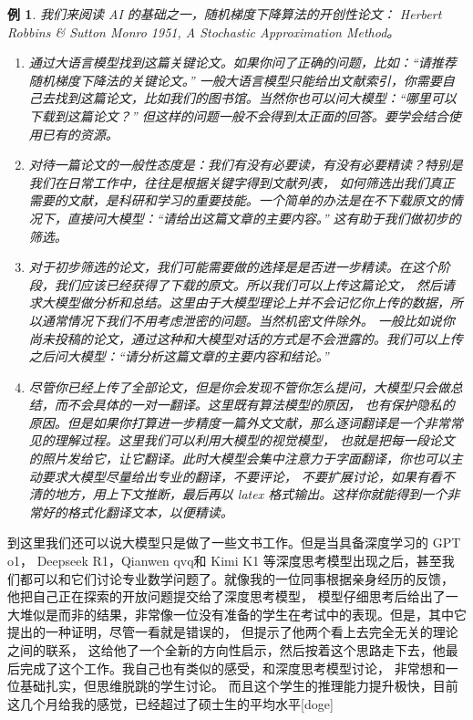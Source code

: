\documentclass{ctexbook}
\newtheorem{example}[theorem]{例}
\numberwithin{theorem}{chapter}
\begin{document}
\begin{example}
  我们来阅读 AI 的基础之一，随机梯度下降算法的开创性论文：
  Herbert Robbins \textup{\&} Sutton Monro 1951, A Stochastic Approximation Method\cite{robbins1951stochastic}。 

  \begin{enumerate}
    \item 通过大语言模型找到这篇关键论文。如果你问了正确的问题，比如：“请推荐随机梯度下降法的关键论文。” 
    一般大语言模型只能给出文献索引，你需要自己去找到这篇论文，比如我们的图书馆。当然你也可以问大模型：“哪里可以下载到这篇论文？” 
    但这样的问题一般不会得到太正面的回答。要学会结合使用已有的资源。
    \item 对待一篇论文的一般性态度是：我们有没有必要读，有没有必要精读？特别是我们在日常工作中，往往是根据关键字得到文献列表，
    如何筛选出我们真正需要的文献，是科研和学习的重要技能。一个简单的办法是在不下载原文的情况下，直接问大模型：“请给出这篇文章的主要内容。”
    这有助于我们做初步的筛选。
    \item 对于初步筛选的论文，我们可能需要做的选择是是否进一步精读。在这个阶段，我们应该已经获得了下载的原文。所以我们可以上传这篇论文，
    然后请求大模型做分析和总结。这里由于大模型理论上并不会记忆你上传的数据，所以通常情况下我们不用考虑泄密的问题。当然机密文件除外。
    一般比如说你尚未投稿的论文，通过这种和大模型对话的方式是不会泄露的。我们可以上传之后问大模型：“请分析这篇文章的主要内容和结论。”
    \item 尽管你已经上传了全部论文，但是你会发现不管你怎么提问，大模型只会做总结，而不会具体的一对一翻译。这里既有算法模型的原因，
    也有保护隐私的原因。但是如果你打算进一步精度一篇外文文献，那么逐词翻译是一个非常常见的理解过程。这里我们可以利用大模型的视觉模型，
    也就是把每一段论文的照片发给它，让它翻译。此时大模型会集中注意力于字面翻译，你也可以主动要求大模型尽量给出专业的翻译，不要评论，
    不要扩展讨论，如果有看不清的地方，用上下文推断，最后再以 latex 格式输出。这样你就能得到一个非常好的格式化翻译文本，以便精读。
  \end{enumerate}
\end{example}

到这里我们还可以说大模型只是做了一些文书工作。但是当具备深度学习的 GPT o1，
Deepseek R1，Qianwen qvq和 Kimi K1 等深度思考模型出现之后，甚至我们都可以和它们讨论专业数学问题了。就像我的一位同事根据亲身经历的反馈，
他把自己正在探索的开放问题提交给了深度思考模型，
模型仔细思考后给出了一大堆似是而非的结果，非常像一位没有准备的学生在考试中的表现。但是，其中它提出的一种证明，尽管一看就是错误的，
但提示了他两个看上去完全无关的理论之间的联系，
这给他了一个全新的方向性启示，然后按着这个思路走下去，他最后完成了这个工作。我自己也有类似的感受，和深度思考模型讨论，
非常想和一位基础扎实，但思维脱跳的学生讨论。
而且这个学生的推理能力提升极快，目前这几个月给我的感觉，已经超过了硕士生的平均水平[doge]
\end{document}
